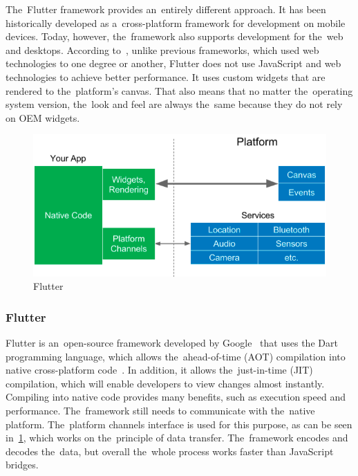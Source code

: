The~Flutter framework provides an~entirely different approach.
It has been historically developed as a~cross-platform framework for development on mobile devices.
Today, however, the~framework also supports development for the~web and desktops.
According to~\cite{leler_2017_whats}, unlike previous frameworks, which used web technologies to one degree or another, Flutter does not use JavaScript and web technologies to achieve better performance.
It uses custom widgets that are rendered to the~platform's canvas.
That also means that no matter the~operating system version, the~look and feel are always the~same because they do not rely on OEM widgets. 

\begin{figure}
    \centering
    \includegraphics[width=1\linewidth]{assets/design/flutter.png}
    \caption{Flutter~\cite{leler_2017_whats}}
    \label{fig:design:flutterview}
\end{figure}

\subsubsection{Flutter}

Flutter is an~open-source framework developed by Google~\cite{a2022_flutter} that uses the Dart programming language, which allows the~ahead-of-time (AOT) compilation into native cross-platform code~\cite{leler_2017_whats}.
In addition, it allows the~just-in-time (JIT) compilation, which will enable developers to view changes almost instantly.
Compiling into native code provides many benefits, such as execution speed and performance.
The~framework still needs to communicate with the~native platform.
The~platform channels interface is used for this purpose, as can be seen in~\ref{fig:design:flutterview}, which works on the~principle of data transfer.
The~framework encodes and decodes the~data, but overall the~whole process works faster than JavaScript bridges.

